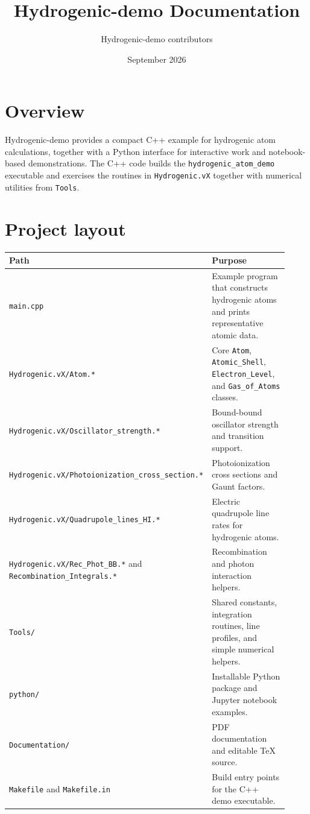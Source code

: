 \documentclass[11pt]{article}
\title{Hydrogenic-demo Documentation}
\author{Hydrogenic-demo contributors}
\date{September 2026}
\begin{document}
\maketitle

\section{Overview}

Hydrogenic-demo provides a compact C++ example for hydrogenic atom calculations, together with a Python interface for interactive work and notebook-based demonstrations. The C++ code builds the \texttt{hydrogenic\_atom\_demo} executable and exercises the routines in \texttt{Hydrogenic.vX} together with numerical utilities from \texttt{Tools}.

\section{Project layout}

\begin{longtable}{p{0.34\linewidth}p{0.58\linewidth}}
\toprule
Path & Purpose \\
\midrule
\texttt{main.cpp} & Example program that constructs hydrogenic atoms and prints representative atomic data. \\
\texttt{Hydrogenic.vX/Atom.*} & Core \texttt{Atom}, \texttt{Atomic\_Shell}, \texttt{Electron\_Level}, and \texttt{Gas\_of\_Atoms} classes. \\
\texttt{Hydrogenic.vX/Oscillator\_strength.*} & Bound-bound oscillator strength and transition support. \\
\texttt{Hydrogenic.vX/Photoionization\_cross\_section.*} & Photoionization cross sections and Gaunt factors. \\
\texttt{Hydrogenic.vX/Quadrupole\_lines\_HI.*} & Electric quadrupole line rates for hydrogenic atoms. \\
\texttt{Hydrogenic.vX/Rec\_Phot\_BB.*} and \texttt{Recombination\_Integrals.*} & Recombination and photon interaction helpers. \\
\texttt{Tools/} & Shared constants, integration routines, line profiles, and simple numerical helpers. \\
\texttt{python/} & Installable Python package and Jupyter notebook examples. \\
\texttt{Documentation/} & PDF documentation and editable TeX source. \\
\texttt{Makefile} and \texttt{Makefile.in} & Build entry points for the C++ demo executable. \\
\bottomrule
\end{longtable}
\end{document}
